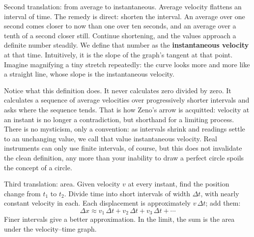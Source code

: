 \begin{center}
\end{center}

Second translation: from average to instantaneous. Average velocity flattens an interval of time. The remedy is direct: shorten the interval. An average over one second comes closer to now than one over ten seconds, and an average over a tenth of a second closer still. Continue shortening, and the values approach a definite number steadily. We define that number as the \textbf{instantaneous velocity} at that time. Intuitively, it is the slope of the graph's tangent at that point. Imagine magnifying a tiny stretch repeatedly: the curve looks more and more like a straight line, whose slope is the instantaneous velocity.

Notice what this definition does. It never calculates zero divided by zero. It calculates a sequence of average velocities over progressively shorter intervals and asks where the sequence tends. That is how Zeno's arrow is acquitted: velocity at an instant is no longer a contradiction, but shorthand for a limiting process. There is no mysticism, only a convention: as intervals shrink and readings settle to an unchanging value, we call that value instantaneous velocity. Real instruments can only use finite intervals, of course, but this does not invalidate the clean definition, any more than your inability to draw a perfect circle spoils the concept of a circle.

Third translation: area. Given velocity \(v\) at every instant, find the position change from \(t_1\) to \(t_2\). Divide time into short intervals of width \(\Delta t\), with nearly constant velocity in each. Each displacement is approximately \(v\,\Delta t\); add them:
\[
\Delta x\approx v_1\,\Delta t+v_2\,\Delta t+v_3\,\Delta t+\cdots
\]
Finer intervals give a better approximation. In the limit, the sum is the area under the velocity--time graph.

